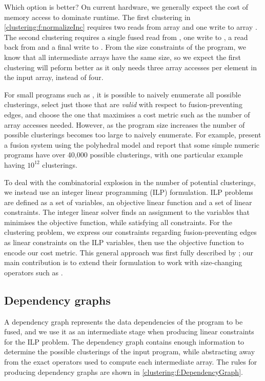 Which option is better?
On current hardware, we generally expect the cost of memory access to dominate runtime.
The first clustering in \cref{clustering:f:normalizeInc} requires two reads from array \Hs@xs@ and one write to array \Hs@ys@.
The second clustering requires a single fused read from \Hs@xs@, one write to \Hs@incs@, a read back from \Hs@incs@ and a final write to \Hs@ys@.
From the size constraints of the program, we know that all intermediate arrays have the same size, so we expect the first clustering will peform better as it only needs three array accesses per element in the input array, instead of four. 

For small programs such as \Hs@normalizeInc@, it is possible to naively enumerate all possible clusterings, select just those that are \emph{valid} with respect to fusion-preventing edges, and choose the one that maximises a cost metric such as the number of array accesses needed.
However, as the program size increases the number of possible clusterings becomes too large to naively enumerate.
For example, \citet{pouchet2010combined,pouchet2011polyhedral} present a fusion system using the polyhedral model and report that some simple numeric programs have over 40,000 possible clusterings, with one particular example having $10^{12}$ clusterings.

To deal with the combinatorial explosion in the number of potential clusterings, we instead use an integer linear programming (ILP) formulation.
ILP problems are defined as a set of variables, an objective linear function and a set of linear constraints.
The integer linear solver finds an assignment to the variables that minimises the objective function, while satisfying all constraints.
For the clustering problem, we express our constraints regarding fusion-preventing edges as linear constraints on the ILP variables, then use the objective function to encode our cost metric.
This general approach was first fully described by \citet{megiddo1998optimal}; our main contribution is to extend their formulation to work with size-changing operators such as \Hs@filter@. 


\subsection{Dependency graphs}
A dependency graph represents the data dependencies of the program to be fused, and we use it as an intermediate stage when producing linear constraints for the ILP problem.
The dependency graph contains enough information to determine the possible clusterings of the input program, while abstracting away from the exact operators used to compute each intermediate array.
The rules for producing dependency graphs are shown in \cref{clustering:f:DependencyGraph}.

